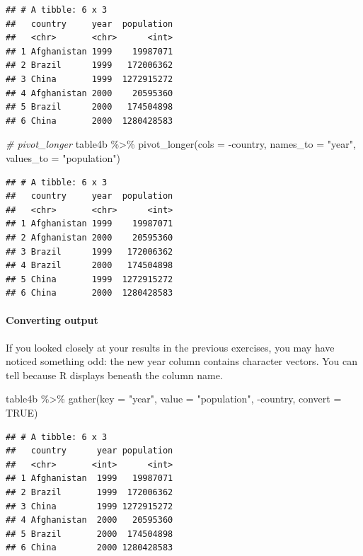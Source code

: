 \documentclass[
]{article}
\newenvironment{Shaded}{\begin{snugshade}}{\end{snugshade}}
\newcommand{\AttributeTok}[1]{\textcolor[rgb]{0.77,0.63,0.00}{#1}}
\newcommand{\CommentTok}[1]{\textcolor[rgb]{0.56,0.35,0.01}{\textit{#1}}}
\newcommand{\ConstantTok}[1]{\textcolor[rgb]{0.00,0.00,0.00}{#1}}
\newcommand{\FunctionTok}[1]{\textcolor[rgb]{0.00,0.00,0.00}{#1}}
\newcommand{\NormalTok}[1]{#1}
\newcommand{\SpecialCharTok}[1]{\textcolor[rgb]{0.00,0.00,0.00}{#1}}
\newcommand{\StringTok}[1]{\textcolor[rgb]{0.31,0.60,0.02}{#1}}
\begin{document}
\begin{verbatim}
## # A tibble: 6 x 3
##   country     year  population
##   <chr>       <chr>      <int>
## 1 Afghanistan 1999    19987071
## 2 Brazil      1999   172006362
## 3 China       1999  1272915272
## 4 Afghanistan 2000    20595360
## 5 Brazil      2000   174504898
## 6 China       2000  1280428583
\end{verbatim}

\begin{Shaded}
\begin{Highlighting}[]
\CommentTok{\# pivot\_longer}
\NormalTok{table4b }\SpecialCharTok{\%\textgreater{}\%} \FunctionTok{pivot\_longer}\NormalTok{(}\AttributeTok{cols =} \SpecialCharTok{{-}}\NormalTok{country, }\AttributeTok{names\_to =} \StringTok{"year"}\NormalTok{, }\AttributeTok{values\_to =} \StringTok{"population"}\NormalTok{)}
\end{Highlighting}
\end{Shaded}

\begin{verbatim}
## # A tibble: 6 x 3
##   country     year  population
##   <chr>       <chr>      <int>
## 1 Afghanistan 1999    19987071
## 2 Afghanistan 2000    20595360
## 3 Brazil      1999   172006362
## 4 Brazil      2000   174504898
## 5 China       1999  1272915272
## 6 China       2000  1280428583
\end{verbatim}

\hypertarget{converting-output}{%
\paragraph{Converting output}\label{converting-output}}

If you looked closely at your results in the previous exercises, you may
have noticed something odd: the new year column contains character
vectors. You can tell because R displays beneath the column name.

\begin{Shaded}
\begin{Highlighting}[]
\NormalTok{table4b }\SpecialCharTok{\%\textgreater{}\%} \FunctionTok{gather}\NormalTok{(}\AttributeTok{key =} \StringTok{"year"}\NormalTok{, }\AttributeTok{value =} \StringTok{"population"}\NormalTok{, }\SpecialCharTok{{-}}\NormalTok{country, }\AttributeTok{convert =} \ConstantTok{TRUE}\NormalTok{)}
\end{Highlighting}
\end{Shaded}

\begin{verbatim}
## # A tibble: 6 x 3
##   country      year population
##   <chr>       <int>      <int>
## 1 Afghanistan  1999   19987071
## 2 Brazil       1999  172006362
## 3 China        1999 1272915272
## 4 Afghanistan  2000   20595360
## 5 Brazil       2000  174504898
## 6 China        2000 1280428583
\end{verbatim}
\end{document}
